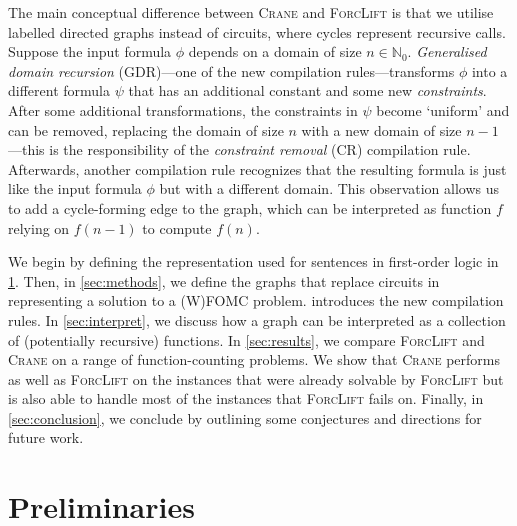 \documentclass{article}
\theoremstyle{definition}
\theoremstyle{remark}
\begin{document}

The main conceptual difference between \textsc{Crane} and \textsc{ForcLift} is
that we utilise labelled directed graphs instead of circuits, where cycles
represent recursive calls. Suppose the input formula $\phi$ depends on a domain
of size $n \in \mathbb{N}_{0}$. \emph{Generalised domain recursion} (GDR)---one
of the new compilation rules---transforms $\phi$ into a different formula $\psi$
that has an additional constant and some new \emph{constraints}. After some
additional transformations, the constraints in $\psi$ become `uniform' and can
be removed, replacing the domain of size $n$ with a new domain of size
$n-1$---this is the responsibility of the \emph{constraint removal} (CR)
compilation rule. Afterwards, another compilation rule recognizes that the
resulting formula is just like the input formula $\phi$ but with a different
domain. This observation allows us to add a cycle-forming edge to the graph,
which can be interpreted as function $f$ relying on $f(n-1)$ to compute $f(n)$.


We begin by defining the representation used for sentences in first-order logic
in \cref{sec:recprelims}. Then, in \cref{sec:methods}, we define the graphs that
replace circuits in representing a solution to a (W)FOMC problem.
 introduces the new compilation rules. In \cref{sec:interpret},
we discuss how a graph can be interpreted as a collection of (potentially
recursive) functions. In \cref{sec:results}, we compare \textsc{ForcLift} and
\textsc{Crane} on a range of function-counting problems. We show that
\textsc{Crane} performs as well as \textsc{ForcLift} on the instances that were
already solvable by \textsc{ForcLift} but is also able to handle most of the
instances that \textsc{ForcLift} fails on. Finally, in \cref{sec:conclusion}, we
conclude by outlining some conjectures and directions for future work.

\section{Preliminaries}\label{sec:recprelims}


\end{document}
